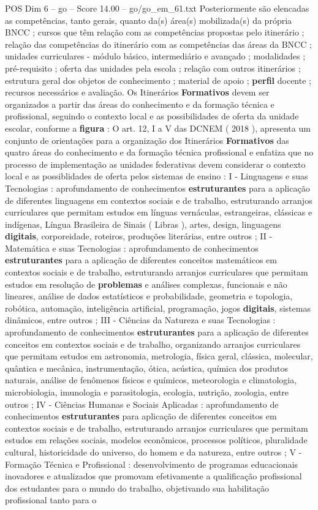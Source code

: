 \begin{textsample}{POS Dim 6 – go – Score 14.00 – go/go\_em\_61.txt}
Posteriormente são elencadas as competências, tanto gerais, quanto da(s) área(s) mobilizada(s) da própria BNCC ; cursos que têm relação com as competências propostas pelo itinerário ; relação das competências do itinerário com as competências das áreas da BNCC ; unidades curriculares - módulo básico, intermediário e avançado ; modalidades ; pré-requisito ; oferta das unidades pela escola ; relação com outros itinerários ; estrutura geral dos objetos de conhecimento ; material de apoio ; \textbf{perfil} docente ; recursos necessários e avaliação.
Os Itinerários \textbf{Formativos} devem ser organizados a partir das áreas do conhecimento e da formação técnica e profissional, seguindo o contexto local e as possibilidades de oferta da unidade escolar, conforme a \textbf{figura} : O art. 12, I a V das DCNEM ( 2018 ), apresenta um conjunto de orientações para a organização dos Itinerários \textbf{Formativos} das quatro áreas do conhecimento e da formação técnica profissional e enfatiza que no processo de implementação as unidades federativas devem considerar o contexto local e as possiblidades de oferta pelos sistemas de ensino : I - Linguagens e suas Tecnologias : aprofundamento de conhecimentos \textbf{estruturantes} para a aplicação de diferentes linguagens em contextos sociais e de trabalho, estruturando arranjos curriculares que permitam estudos em línguas vernáculas, estrangeiras, clássicas e indígenas, Língua Brasileira de Sinais ( Libras ), artes, design, linguagens \textbf{digitais}, corporeidade, roteiros, produções literárias, entre outros ; II - Matemática e suas Tecnologias : aprofundamento de conhecimentos \textbf{estruturantes} para a aplicação de diferentes conceitos matemáticos em contextos sociais e de trabalho, estruturando arranjos curriculares que permitam estudos em resolução de \textbf{problemas} e análises complexas, funcionais e não lineares, análise de dados estatísticos e probabilidade, geometria e topologia, robótica, automação, inteligência artificial, programação, jogos \textbf{digitais}, sistemas dinâmicos, entre outros ; III - Ciências da Natureza e suas Tecnologias : aprofundamento de conhecimentos \textbf{estruturantes} para a aplicação de diferentes conceitos em contextos sociais e de trabalho, organizando arranjos curriculares que permitam estudos em astronomia, metrologia, física geral, clássica, molecular, quântica e mecânica, instrumentação, ótica, acústica, química dos produtos naturais, análise de fenômenos físicos e químicos, meteorologia e climatologia, microbiologia, imunologia e parasitologia, ecologia, nutrição, zoologia, entre outros ; IV - Ciências Humanas e Sociais Aplicadas : aprofundamento de conhecimentos \textbf{estruturantes} para aplicação de diferentes conceitos em contextos sociais e de trabalho, estruturando arranjos curriculares que permitam estudos em relações sociais, modelos econômicos, processos políticos, pluralidade cultural, historicidade do universo, do homem e da natureza, entre outros ; V - Formação Técnica e Profissional : desenvolvimento de programas educacionais inovadores e atualizados que promovam efetivamente a qualificação profissional dos estudantes para o mundo do trabalho, objetivando sua habilitação profissional tanto para o 
\end{textsample}
